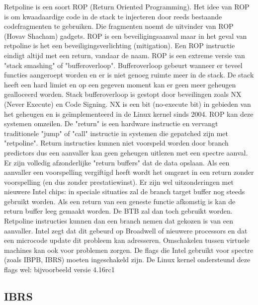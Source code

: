 Retpoline is een soort ROP (Return Oriented Programming).
Het idee van ROP  is om kwaadaardige code in de stack te injecteren door reeds bestaande codefragmenten te gebruiken.
Die fragmenten noemt de uitvinder van ROP (Hovav Shacham) gadgets. \parencite{Shacham2007}
ROP is een beveiligingsaanval maar in het geval van retpoline is het een beveiligingsverlichting (mitigation).
Een ROP instructie eindigt altijd met een return, vandaar de naam.
ROP is een extreme versie van "stack smashing" of "bufferoverloop".
Bufferoverloop gebeurt wanneer er teveel functies aangeroept worden en er is niet genoeg ruimte meer in de stack. De stack heeft een hard limiet en op een gegeven moment kan er geen meer geheugen gealloceerd worden.
Stack bufferoverloop is gestopt door beveilingen zoals NX (Never Execute) en Code Signing.
NX is een bit (no-execute bit) in gebieden van het geheugen en is geïmplementeerd in de Linux kernel sinds 2004.\parencite{KernelNewbies2004}
ROP kan deze systemen omzeilen. 
De "return" is een hardware instructie en vervangt traditionele "jump" of "call" instructie in systemen die gepatched zijn met "retpoline". Return instructies kunnen niet voorspeld worden door branch predictors dus een aanvaller kan geen geheugen uitlezen met een spectre aanval.
Er zijn volledig afzonderlijke "return buffers" dat de data opslaan. Als een aanvaller een voorspelling vergiftigd heeft wordt het omgezet in een return zonder voorspelling (en dus zonder prestatiewinst). Er zijn wel uitzonderingen met nieuwere Intel chips: in speciale situaties zal de branch target buffer nog steeds gebruikt worden.
Als een return van een geneste functie afkomstig is kan de return buffer leeg gemaakt worden. De BTB zal dan toch gebruikt worden. Retpoline instructies kunnen dan een branch nemen dat gekozen is van een aanvaller. Intel zegt dat dit gebeurd op Broadwell of nieuwere processors en dat een microcode update dit probleem kan adresseren.
Omschakelen tussen virtuele machines kan ook voor problemen zorgen. De flags die Intel gebruikt voor spectre (zoals IBPB, IBRS) moeten ingeschakeld zijn. De Linux kernel ondersteund deze flags wel: bijvoorbeeld versie 4.16rc1

\subsection{IBRS}

